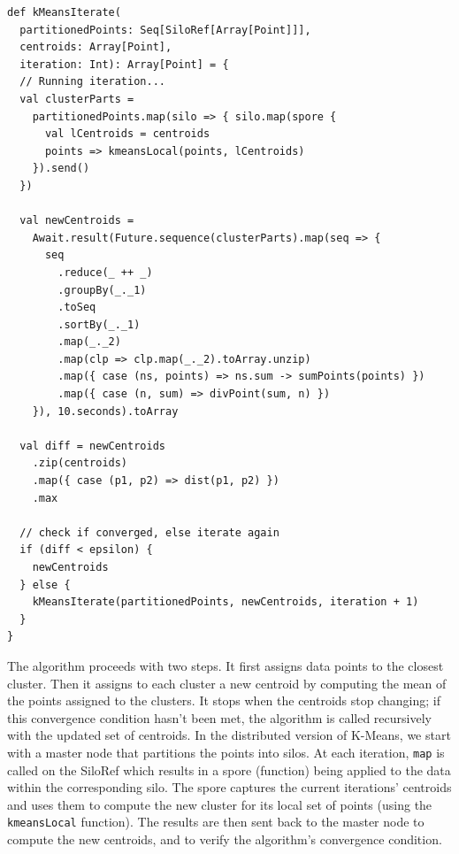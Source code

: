 \documentclass{jfp1}
\begin{document}
\begin{lstlisting}
def kMeansIterate(
  partitionedPoints: Seq[SiloRef[Array[Point]]],
  centroids: Array[Point],
  iteration: Int): Array[Point] = {
  // Running iteration...
  val clusterParts =
    partitionedPoints.map(silo => { silo.map(spore {
      val lCentroids = centroids
      points => kmeansLocal(points, lCentroids)
    }).send()
  })

  val newCentroids =
    Await.result(Future.sequence(clusterParts).map(seq => {
      seq
        .reduce(_ ++ _)
        .groupBy(_._1)
        .toSeq
        .sortBy(_._1)
        .map(_._2)
        .map(clp => clp.map(_._2).toArray.unzip)
        .map({ case (ns, points) => ns.sum -> sumPoints(points) })
        .map({ case (n, sum) => divPoint(sum, n) })
    }), 10.seconds).toArray

  val diff = newCentroids
    .zip(centroids)
    .map({ case (p1, p2) => dist(p1, p2) })
    .max

  // check if converged, else iterate again
  if (diff < epsilon) {
    newCentroids
  } else {
    kMeansIterate(partitionedPoints, newCentroids, iteration + 1)
  }
}
\end{lstlisting}
The algorithm proceeds with two steps. It first assigns data points to the
closest cluster. Then it assigns to each cluster a new centroid by computing the
mean of the points assigned to the clusters. It stops when the centroids stop
changing; if this convergence condition hasn't been met, the algorithm is called
recursively with the updated set of centroids. In the distributed version of
K-Means, we start with a master node that partitions the points into silos. At
each iteration, \verb|map| is called on the SiloRef which results in a spore
(function) being applied to the data within the corresponding silo. The spore
captures the current iterations' centroids and uses them to compute the new
cluster for its local set of points (using the \verb|kmeansLocal| function). The
results are then sent back to the master node to compute the new centroids, and
to verify the algorithm's convergence condition.


\end{document}
